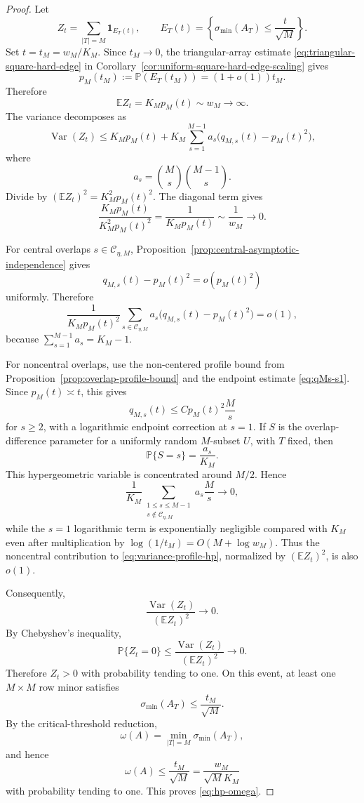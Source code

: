 \documentclass[11pt]{article}
\DeclareMathOperator{\Var}{Var}
\newcommand{\Pbb}{\mathbb P}
\newcommand{\Ebb}{\mathbb E}
\newcommand{\1}{\mathbf 1}
\newcommand{\smin}{\sigma_{\min}}
\begin{document}
\begin{proof}
Let
\[
        Z_t=\sum_{|T|=M}\1_{E_T(t)},
        \qquad
        E_T(t)=\left\{\smin(A_T)\le\frac{t}{\sqrt M}\right\}.
\]
Set \(t=t_M=w_M/K_M\).  Since \(t_M\to0\), the triangular-array estimate
\eqref{eq:triangular-square-hard-edge} in
Corollary~\ref{cor:uniform-square-hard-edge-scaling} gives
\[
        p_M(t_M):=\Pbb(E_T(t_M))=(1+o(1))t_M.
\]
Therefore
\[
        \Ebb Z_t=K_Mp_M(t)\sim w_M\to\infty.
\]
The variance decomposes as
\begin{equation}
        \Var(Z_t)
        \le
        K_Mp_M(t)
        +K_M\sum_{s=1}^{M-1}a_s\bigl(q_{M,s}(t)-p_M(t)^2\bigr),
        \label{eq:variance-profile-hp}
\end{equation}
where
\[
        a_s=\binom Ms\binom{M-1}s.
\]
Divide by \((\Ebb Z_t)^2=K_M^2p_M(t)^2\).  The diagonal term gives
\[
        \frac{K_Mp_M(t)}{K_M^2p_M(t)^2}
        =
        \frac{1}{K_Mp_M(t)}
        \sim
        \frac{1}{w_M}
        \longrightarrow0.
\]

For central overlaps \(s\in\mathcal C_{\eta,M}\), Proposition~\ref{prop:central-asymptotic-independence} gives
\[
        q_{M,s}(t)-p_M(t)^2=o(p_M(t)^2)
\]
uniformly.  Therefore
\[
        \frac1{K_Mp_M(t)^2}
        \sum_{s\in\mathcal C_{\eta,M}}
        a_s\bigl(q_{M,s}(t)-p_M(t)^2\bigr)
        =o(1),
\]
because \(\sum_{s=1}^{M-1}a_s=K_M-1\).

For noncentral overlaps, use the non-centered profile bound from
Proposition~\ref{prop:overlap-profile-bound} and the endpoint estimate \eqref{eq:qMs-s1}.  Since
\(p_M(t)\asymp t\), this gives
\[
        q_{M,s}(t)\le C p_M(t)^2\frac{M}{s}
\]
for \(s\ge2\), with a logarithmic endpoint correction at \(s=1\).  If \(S\) is the
overlap-difference parameter for a uniformly random \(M\)-subset \(U\), with \(T\) fixed,
then
\[
        \Pbb\{S=s\}=\frac{a_s}{K_M}.
\]
This hypergeometric variable is concentrated around \(M/2\).  Hence
\[
        \frac1{K_M}
        \sum_{\substack{1\le s\le M-1\\s\notin\mathcal C_{\eta,M}}}
        a_s\frac{M}{s}
        \longrightarrow0,
\]
while the \(s=1\) logarithmic term is exponentially negligible compared with \(K_M\)
even after multiplication by \(\log(1/t_M)=O(M+\log w_M)\).  Thus the noncentral
contribution to \eqref{eq:variance-profile-hp}, normalized by \((\Ebb Z_t)^2\), is also
\(o(1)\).

Consequently,
\[
        \frac{\Var(Z_t)}{(\Ebb Z_t)^2}\longrightarrow0.
\]
By Chebyshev's inequality,
\[
        \Pbb\{Z_t=0\}
        \le
        \frac{\Var(Z_t)}{(\Ebb Z_t)^2}
        \longrightarrow0.
\]
Therefore \(Z_t>0\) with probability tending to one.  On this event, at least one
\(M\times M\) row minor satisfies
\[
        \smin(A_T)\le\frac{t_M}{\sqrt M}.
\]
By the critical-threshold reduction,
\[
        \omega(A)=\min_{|T|=M}\smin(A_T),
\]
and hence
\[
        \omega(A)\le\frac{t_M}{\sqrt M}
        =
        \frac{w_M}{\sqrt M K_M}
\]
with probability tending to one.  This proves \eqref{eq:hp-omega}.


\end{proof}
\end{document}
